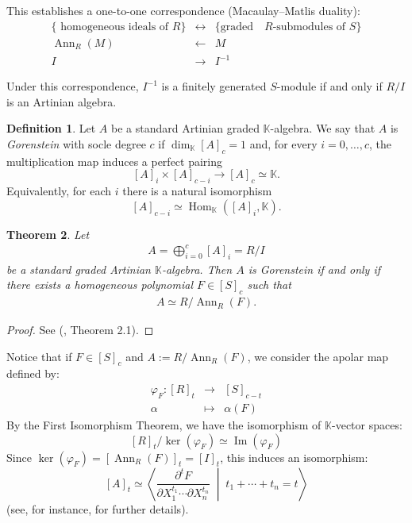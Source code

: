 \documentclass[12pt,twoside]{amsart}
\numberwithin{equation}{section} \hyphenation{semi-stable}
\newcommand{\K}{\mathbb{K}}
\newtheorem{theorem}{Theorem}[section]
\theoremstyle{definition}
\newtheorem{definition}[theorem]{Definition}
\begin{document}
This establishes a one-to-one correspondence (Macaulay--Matlis duality):
\begin{eqnarray*}
\{\text { homogeneous ideals of } R\} & \leftrightarrow &  \{\text{graded } \text { $R$-submodules of } S\} \\
\operatorname{Ann}_R(M) & \leftarrow & M \\
I & \rightarrow & I^{-1}
\end{eqnarray*}

Under this correspondence, $I^{-1}$ is a finitely generated $S$-module 
if and only if $R/I$ is an Artinian algebra.
\begin{definition} Let $A$ be a standard Artinian  graded $\K$-algebra.
    We say that $A$ is \textit{Gorenstein} with socle degree $c$ if $\dim_{\mathbb{K}} [A]_c = 1$
and, for every $i=0,\ldots,c$, the multiplication map induces a perfect pairing
$$
[A]_i \times [A]_{c-i} \longrightarrow [A]_c \simeq \mathbb{K}.
$$
Equivalently, for each $i$ there is a natural isomorphism
$$
[A]_{c-i} \simeq \operatorname{Hom}_{\mathbb{K}}([A]_i,\mathbb{K}).
$$
\end{definition}
\begin{theorem}\label{Gor}
Let 
\begin{eqnarray*}
A=\bigoplus_{i=0}^c [A]_i = R/I
\end{eqnarray*}
be a standard graded Artinian $\mathbb{K}$-algebra. 
Then $A$ is Gorenstein if and only if there exists a homogeneous polynomial 
$F \in [S]_c$ such that
\begin{eqnarray*}
A \simeq R/\operatorname{Ann}_R(F).
\end{eqnarray*}
\end{theorem}
\begin{proof}
See (\cite{MW09}, Theorem 2.1).
\end{proof}

Notice that if $F \in [S]_c$ and $A := R/\operatorname{Ann}_R(F)$, we consider the apolar map defined by:
\begin{eqnarray*}
\varphi_F : [R]_t & \longrightarrow & [S]_{c-t} \\
\alpha & \longmapsto & \alpha(F)
\end{eqnarray*}
By the First Isomorphism Theorem, we have the isomorphism of $\mathbb{K}$-vector spaces:
$$ [R]_t / \ker(\varphi_F) \simeq \operatorname{Im}(\varphi_F) $$
Since $\ker(\varphi_F) = [\operatorname{Ann}_R(F)]_t = [I]_t$, this induces an isomorphism:
$$ [A]_t \simeq \left\langle \frac{\partial ^{t}F}{\partial X_1^{t_1}\cdots \partial X_n^{t_n}} \;\middle|\; t_1+\cdots +t_n= t \right\rangle $$
(see, for instance, \cite[Section 1.1] {IK} for further details).
\end{document}
